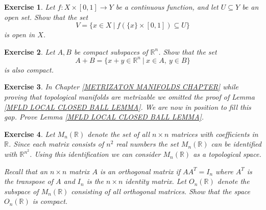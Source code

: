 \documentclass[11pt, letterpaper, oneside]{report}
\theoremstyle{pplain}
\newtheorem{ITERMVALUE THM}[theorem]{Intermediate Value Theorem}
\newtheorem{HEINEBOREL THM}[theorem]{Heine-Borel Theorem}
\newtheorem{UMETR THM}[theorem]{Urysohn Metrization Theorem}
\newtheorem{UMETR2 THM}[theorem]{Urysohn Metrization Theorem (v.2)}
\theoremstyle{ddefinition}
\theoremstyle{nnn}
\newtheorem{TDA NN}[theorem]{Topological Data Analysis. }
\theoremstyle{eexercise}
\newtheorem{exercise}{Exercise}[chapter]
\newcommand{\R}{{\mathbb R}}
\begin{document}
\begin{exercise}
Let $f\colon X\times [0, 1] \to Y$ be a continuous function, and let $U\subseteq Y$
be an open set. Show that the set 
$$V = \{x\in X \ | \ f(\{x\}\times [0, 1]) \subseteq U\}$$ is open in $X$.
\end{exercise}





\begin{exercise}
Let $A, B$ be compact subspaces of $\R^{n}$. Show that the set
$$A+B = \{ x+y\in \R^{n} \ | \ x\in A, \ y\in B \}$$
is also compact. 
\end{exercise}



%
%
%

\begin{exercise}
\label{MFLD LOCAL CLOSED BALL EXERCISE}
In Chapter \ref{METRIZATON MANIFOLDS CHAPTER} while proving that topological 
manifolds are metrizable we omitted the proof of Lemma 
\ref{MFLD LOCAL CLOSED BALL LEMMA}. We are now in position to fill this gap. 
Prove Lemma \ref{MFLD LOCAL CLOSED BALL LEMMA}. 
\end{exercise}





\begin{exercise}
Let $M_{n}(\R)$ denote the set of all $n\times n$ matrices with coefficients in $\R$. Since 
each matrix consists of $n^{2}$ real numbers the set $M_{n}(\R)$ can be identified with $\R^{n^{2}}$.
Using this identification we can consider $M_{n}(\R)$ as a topological space. 


Recall that an $n\times n$ matrix $A$ is an orthogonal matrix if $AA^{T} = I_{n}$ where 
$A^{T}$ is the transpose of $A$ and $I_{n}$ is the $n\times n$ identity matrix. Let 
$O_{n}(\R)$ denote the subspace of $M_{n}(\R)$ consisting of all orthogonal matrices. 
Show that the space $O_{n}(\R)$  is compact. 
\end{exercise}
\end{document}
